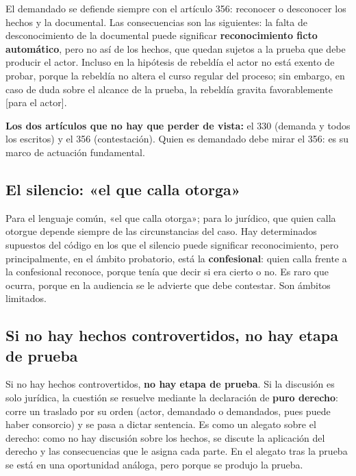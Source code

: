 \documentclass[12pt,oneside]{book}
\begin{document}
El demandado se defiende siempre con el artículo 356: reconocer o desconocer los hechos y la documental. Las consecuencias son las siguientes: la falta de desconocimiento de la documental puede significar \textbf{reconocimiento ficto automático}, pero no así de los hechos, que quedan sujetos a la prueba que debe producir el actor. Incluso en la hipótesis de rebeldía el actor no está exento de probar, porque la rebeldía no altera el curso regular del proceso; sin embargo, en caso de duda sobre el alcance de la prueba, la rebeldía gravita favorablemente [para el actor].

\begin{important}
\textbf{Los dos artículos que no hay que perder de vista:} el 330 (demanda y todos los escritos) y el 356 (contestación). Quien es demandado debe mirar el 356: es su marco de actuación fundamental.
\end{important}

\subsection{El silencio: «el que calla otorga»}

Para el lenguaje común, «el que calla otorga»; para lo jurídico, que quien calla otorgue depende siempre de las circunstancias del caso. Hay determinados supuestos del código en los que el silencio puede significar reconocimiento, pero principalmente, en el ámbito probatorio, está la \textbf{confesional}: quien calla frente a la confesional reconoce, porque tenía que decir si era cierto o no. Es raro que ocurra, porque en la audiencia se le advierte que debe contestar. Son ámbitos limitados.

\subsection{Si no hay hechos controvertidos, no hay etapa de prueba}

Si no hay hechos controvertidos, \textbf{no hay etapa de prueba}. Si la discusión es solo jurídica, la cuestión se resuelve mediante la declaración de \textbf{puro derecho}: corre un traslado por su orden (actor, demandado o demandados, pues puede haber consorcio) y se pasa a dictar sentencia. Es como un alegato sobre el derecho: como no hay discusión sobre los hechos, se discute la aplicación del derecho y las consecuencias que le asigna cada parte. En el alegato tras la prueba se está en una oportunidad análoga, pero porque se produjo la prueba.
\end{document}
